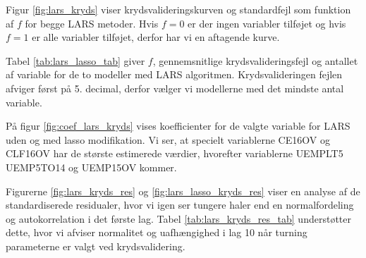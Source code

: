 
Figur \ref{fig:lars_kryds} viser krydsvalideringskurven og standardfejl som funktion af  $f$ for begge LARS metoder. Hvis $f = 0$ er der ingen variabler tilføjet og hvis $f=1$ er alle variabler tilføjet, derfor har vi en aftagende kurve. 



Tabel \ref{tab:lars_lasso_tab} giver $f$, gennemsnitlige krydsvalideringsfejl og antallet af variable for de to modeller med LARS algoritmen. 
Krydsvalideringen fejlen afviger først på 5. decimal, derfor vælger vi modellerne med det mindste antal variable. 
%

%
På figur \ref{fig:coef_lars_kryds} vises koefficienter for de valgte variable for LARS uden og med lasso modifikation. 
Vi ser, at specielt variablerne \textcolor{blue3}{CE16OV} og \textcolor{blue3}{CLF16OV} har de største estimerede værdier, hvorefter variablerne \textcolor{blue3}{UEMPLT5} \textcolor{blue3}{UEMP5TO14} og \textcolor{blue3}{UEMP15OV} kommer. 


Figurerne \ref{fig:lars_kryds_res} og  \ref{fig:lars_lasso_kryds_res} viser en analyse af de standardiserede residualer, hvor vi igen ser tungere haler end en normalfordeling og autokorrelation i det første lag. Tabel \ref{tab:lars_kryds_res_tab}  understøtter dette, hvor vi afviser normalitet og uafhængighed i lag 10 når turning parameterne er valgt ved krydsvalidering. 

